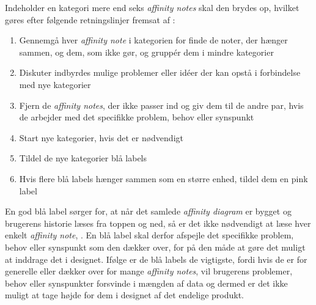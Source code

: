Indeholder en kategori mere end seks \textit{affinity notes} skal den brydes op, hvilket gøres efter følgende retningslinjer fremsat af \textcite[s. 170]{Book:BuildingAnAffinity}:\blankline
%
\begin{enumerate}
  \item Gennemgå hver \textit{affinity note} i kategorien for finde de noter, der hænger sammen, og dem, som ikke gør, og gruppér dem i mindre kategorier
  \item Diskuter indbyrdes mulige problemer eller idéer der kan opstå i forbindelse med nye kategorier
  \item Fjern de \textit{affinity notes}, der ikke passer ind og giv dem til de andre par, hvis de arbejder med det specifikke problem, behov eller synspunkt
  \item Start nye kategorier, hvis det er nødvendigt 
  \item Tildel de nye kategorier blå labels
  \item Hvis flere blå labels hænger sammen som en større enhed, tildel dem en pink label\blankline 
\end{enumerate}
%
En god blå label sørger for, at når det samlede \textit{affinity diagram} er bygget og brugerens historie læses fra toppen og ned, så er det ikke nødvendigt at læse hver enkelt \textit{affinity note}, \parencite[ss. 170-171]{Book:BuildingAnAffinity}. En blå label skal derfor afspejle det specifikke problem, behov eller synspunkt som den dækker over, for på den måde at gøre det muligt at inddrage det i designet. Ifølge \textcite[s. 171]{Book:BuildingAnAffinity} er de blå labels de vigtigste, fordi hvis de er for generelle eller dækker over for mange \textit{affinity notes}, vil brugerens problemer, behov eller synspunkter forsvinde i mængden af data og dermed er det ikke muligt at tage højde for dem i designet af det endelige produkt. 

